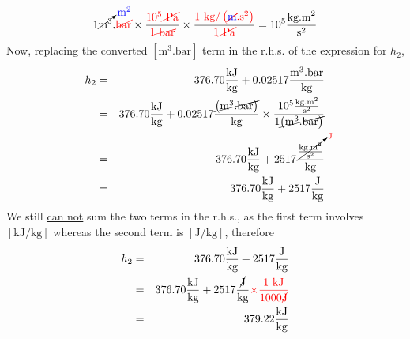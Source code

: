 \begin{list}{\bf Example :~}{}
\begin{description}
       \begin{displaymath}
          1 \cancelto{\textcolor{blue}{\text{m}^{2}}}{\text{m}^{3}}.\textcolor{red}{\cancel{\text{bar}}} \times \displaystyle\frac{\textcolor{red}{10^{5}\cancel{\text{ Pa}}}}{\textcolor{red}{1 \cancel{\text{ bar}}}} \times \displaystyle\frac{\textcolor{red}{ 1 \text{ kg}/\left(\cancel{\textcolor{blue}{\text{m}}}.\text{s}^{2}\right)}}{\textcolor{red}{ 1 \cancel{\text{ Pa}}}} = 10^{5} \frac{\text{kg.m}^{2}}{\text{s}^{2}}
       \end{displaymath}
       Now, replacing the converted $\left[\text{m}^{3}.\text{bar}\right]$ term in the r.h.s. of the expression for $h_{2}$,
       \begin{eqnarray}
         h_{2} &=& 376.70\displaystyle\frac{\text{kJ}}{\text{kg}} + 0.02517 \displaystyle\frac{\text{m}^{3}.\text{bar}}{\text{kg}} \nonumber \\
              &=& 376.70\displaystyle\frac{\text{kJ}}{\text{kg}} + 0.02517 \displaystyle\frac{\cancel{\left(\text{m}^{3}.\text{bar}\right)}}{\text{kg}} \times \displaystyle\frac{10^{5} \frac{\text{kg.m}^{2}}{\text{s}^{2}}}{1 \cancel{\left(\text{m}^{3}.\text{bar}\right)}} \nonumber \\
              &=& 376.70\displaystyle\frac{\text{kJ}}{\text{kg}} + 2517 \displaystyle\frac{\cancelto{\textcolor{red}{\text{J}}}{\frac{\text{kg.m}^{2}}{\text{s}^{2}}}}{\text{kg}}\nonumber\\
              &=& 376.70\displaystyle\frac{\text{kJ}}{\text{kg}} + 2517 \displaystyle\frac{\text{J}}{\text{kg}} \nonumber
       \end{eqnarray}
       We still \underline{can not} sum the two terms in the r.h.s., as the first term involves $\left[\text{kJ/kg}\right]$ whereas the second term is $\left[\text{J/kg}\right]$, therefore
       \begin{eqnarray}
         h_{2} &=& 376.70\displaystyle\frac{\text{kJ}}{\text{kg}} + 2517 \displaystyle\frac{\text{J}}{\text{kg}} \nonumber\\
              &=& 376.70\displaystyle\frac{\text{kJ}}{\text{kg}} + 2517 \displaystyle\frac{\cancel{\text{J}}}{\text{kg}} \textcolor{red}{\times \displaystyle\frac{1\text{ kJ}}{1000 \cancel{\text{J}}}}\nonumber\\
              &=& 379.22 \displaystyle\frac{\text{kJ}}{\text{kg}}\nonumber
       \end{eqnarray}
       


     \end{description}
%
\end{list}

  
